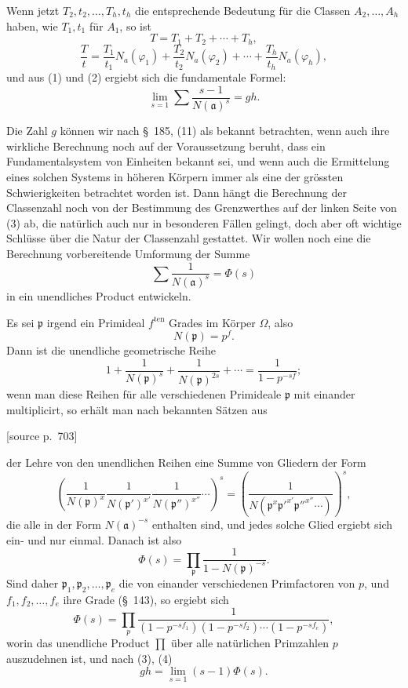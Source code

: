 \documentclass[11pt]{article}
\newcommand{\srcpage}[1]{\par\medskip\noindent\textsf{[source p.~#1]}\par\smallskip}
\begin{document}
Wenn jetzt $T_2,t_2,\ldots,T_h,t_h$ die entsprechende Bedeutung für die Classen $A_2,\ldots,A_h$ haben, wie $T_1,t_1$ für $A_1$, so ist
\[
T=T_1+T_2+\cdots+T_h,
\]
\[
\frac{T}{t}=\frac{T_1}{t_1}N_a(\varphi_1)+\frac{T_2}{t_2}N_a(\varphi_2)+\cdots+
\frac{T_h}{t_h}N_a(\varphi_h),
\]
und aus (1) und (2) ergiebt sich die fundamentale Formel:
\begin{equation}
\lim_{s=1}\sum\frac{s-1}{N(\mathfrak a)^s}=gh.
\tag{3}
\end{equation}

Die Zahl $g$ können wir nach \S~185, (11) als bekannt betrachten, wenn auch ihre wirkliche Berechnung noch auf der Voraussetzung beruht, dass ein Fundamentalsystem von Einheiten bekannt sei, und wenn auch die Ermittelung eines solchen Systems in höheren Körpern immer als eine der grössten Schwierigkeiten betrachtet worden ist. Dann hängt die Berechnung der Classenzahl noch von der Bestimmung des Grenzwerthes auf der linken Seite von (3) ab, die natürlich auch nur in besonderen Fällen gelingt, doch aber oft wichtige Schlüsse über die Natur der Classenzahl gestattet. Wir wollen noch eine die Berechnung vorbereitende Umformung der Summe
\begin{equation}
\sum\frac1{N(\mathfrak a)^s}=\Phi(s)
\tag{4}
\end{equation}
in ein unendliches Product entwickeln.

Es sei $\mathfrak p$ irgend ein Primideal $f^{\mathrm{ten}}$ Grades im Körper $\Omega$, also
\[
N(\mathfrak p)=p^f.
\]
Dann ist die unendliche geometrische Reihe
\[
1+\frac1{N(\mathfrak p)^s}+\frac1{N(\mathfrak p)^{2s}}+\cdots
=\frac1{1-p^{-sf}};
\]
wenn man diese Reihen für alle verschiedenen Primideale $\mathfrak p$ mit einander multiplicirt, so erhält man nach bekannten Sätzen aus

\srcpage{703}
der Lehre von den unendlichen Reihen eine Summe von Gliedern der Form
\[
\left(\frac1{N(\mathfrak p)^x}\frac1{N(\mathfrak p')^{x'}}\frac1{N(\mathfrak p'')^{x''}}\cdots\right)^s
=\left(\frac1{N(\mathfrak p^x\mathfrak p'^{x'}\mathfrak p''^{x''}\cdots)}\right)^s,
\]
die alle in der Form $N(\mathfrak a)^{-s}$ enthalten sind, und jedes solche Glied ergiebt sich ein- und nur einmal. Danach ist also
\begin{equation}
\Phi(s)=\prod_{\mathfrak p}\frac1{1-N(\mathfrak p)^{-s}}.
\tag{5}
\end{equation}
Sind daher $\mathfrak p_1,\mathfrak p_2,\ldots,\mathfrak p_e$ die von einander verschiedenen Primfactoren von $p$, und $f_1,f_2,\ldots,f_e$ ihre Grade (\S~143), so ergiebt sich
\begin{equation}
\Phi(s)=\prod_p
\frac1{(1-p^{-sf_1})(1-p^{-sf_2})\cdots(1-p^{-sf_e})},
\tag{6}
\end{equation}
worin das unendliche Product $\prod$ über alle natürlichen Primzahlen $p$ auszudehnen ist, und nach (3), (4)
\begin{equation}
gh=\lim_{s=1}(s-1)\Phi(s).
\tag{7}
\end{equation}
\end{document}
